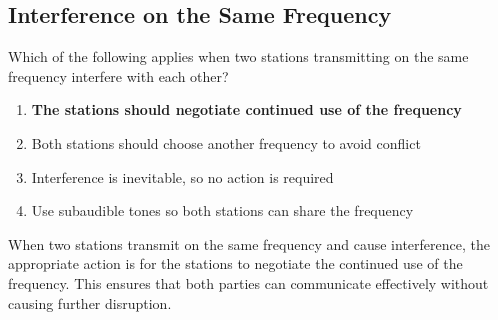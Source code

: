 \subsection{Interference on the Same Frequency}
\label{T2B08}

\begin{tcolorbox}[colback=gray!10!white,colframe=black!75!black,title=T2B08]
Which of the following applies when two stations transmitting on the same frequency interfere with each other?
\begin{enumerate}[noitemsep]
    \item \textbf{The stations should negotiate continued use of the frequency}
    \item Both stations should choose another frequency to avoid conflict
    \item Interference is inevitable, so no action is required
    \item Use subaudible tones so both stations can share the frequency
\end{enumerate}
\end{tcolorbox}

When two stations transmit on the same frequency and cause interference, the appropriate action is for the stations to negotiate the continued use of the frequency. This ensures that both parties can communicate effectively without causing further disruption.